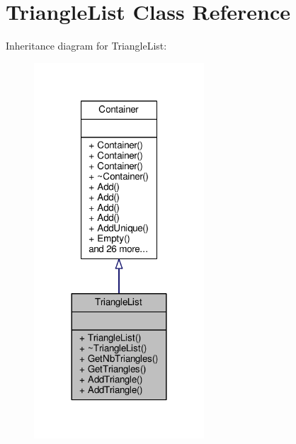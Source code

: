 \hypertarget{classTriangleList}{}\section{Triangle\+List Class Reference}
\label{classTriangleList}


Inheritance diagram for Triangle\+List\+:
\nopagebreak
\begin{figure}[H]
\begin{center}
\leavevmode
\includegraphics[width=180pt]{d7/dfb/classTriangleList__inherit__graph}
\end{center}
\end{figure}


